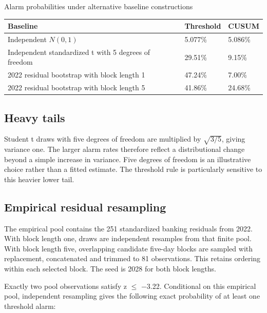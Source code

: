 \documentclass[11pt,a4paper]{article}
\newcommand{\reporttablefont}{\fontsize{9.4}{11.7}\selectfont}
\begin{document}
\begin{minipage}{\linewidth}\captionsetup{type=table}\caption{Alarm probabilities under alternative baseline constructions}\reporttablefont\renewcommand{\arraystretch}{1.22}\begin{tabular}{@{}L{0.657143\dimexpr{}\tabcolsep\relax}C{0.171429\dimexpr{}\tabcolsep\relax}C{0.171429\dimexpr{}\tabcolsep\relax}@{}}\toprule
{\sffamily\bfseries\color{navy}Baseline} & {\sffamily\bfseries\color{navy}Threshold} & {\sffamily\bfseries\color{navy}CUSUM}\\\midrule
Independent $N(0,1)$ & 5.077\% & 5.086\%\\
Independent standardized t with 5 degrees of freedom & 29.51\% & 9.15\%\\
2022 residual bootstrap with block length 1 & 47.24\% & 7.00\%\\
2022 residual bootstrap with block length 5 & 41.86\% & 24.68\%\\
\bottomrule\end{tabular}\end{minipage}\par\vspace{5pt}
\subsection*{Heavy tails}
Student t draws with five degrees of freedom are multiplied by $\sqrt{3/5}$, giving variance one. The larger alarm rates therefore reflect a distributional change beyond a simple increase in variance. Five degrees of freedom is an illustrative choice rather than a fitted estimate. The threshold rule is particularly sensitive to this heavier lower tail.

\subsection*{Empirical residual resampling}
The empirical pool contains the 251 standardized banking residuals from 2022. With block length one, draws are independent resamples from that finite pool. With block length five, overlapping candidate five-day blocks are sampled with replacement, concatenated and trimmed to 81 observations. This retains ordering within each selected block. The seed is 2028 for both block lengths.

Exactly two pool observations satisfy z $\leq$ $-$3.22. Conditional on this empirical pool, independent resampling gives the following exact probability of at least one threshold alarm:
\end{document}
